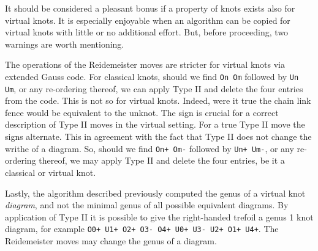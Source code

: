         \par\hfill\par
        It should be considered a pleasant bonus if a property of knots exists
        also for virtual knots. It is especially enjoyable when an
        algorithm can be copied for virtual knots with little or no additional
        effort. But, before proceeding, two warnings are worth mentioning.
        \par\hfill\par
        The operations of the Reidemeister moves are stricter for virtual knots
        via extended Gauss code. For classical knots, should we find
        \texttt{On Om} followed by \texttt{Un Um}, or any re-ordering thereof,
        we can apply Type II and delete the four entries from the code. This is
        not so for virtual knots. Indeed, were it true the chain link fence
        would be equivalent to the unknot. The sign is crucial for a correct
        description of Type II moves in the virtual setting. For a true
        Type II move the signs alternate. This in agreement with the fact that
        Type II does not change the writhe of a diagram. So, should we find
        \texttt{On+ Om-} followed by \texttt{Un+ Um-}, or any re-ordering
        thereof, we may apply Type II and delete the four entries, be it a
        classical or virtual knot.
        \par\hfill\par
        Lastly, the algorithm described previously computed the genus of a
        virtual knot \textit{diagram}, and not the minimal genus of all
        possible equivalent diagrams. By application of Type II it is possible
        to give the right-handed trefoil a genus 1 knot diagram, for example
        \texttt{O0+ U1+ O2+ O3- O4+ U0+ U3- U2+ O1+ U4+}. The Reidemeister
        moves may change the genus of a diagram.
